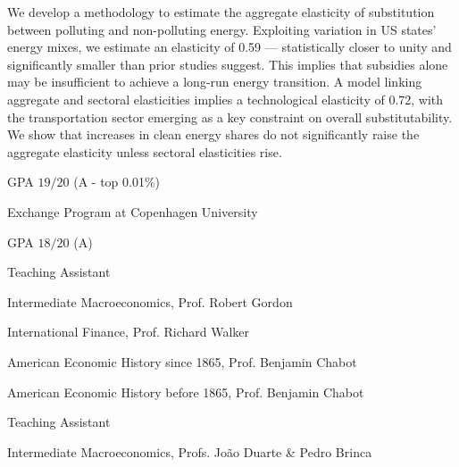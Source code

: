 \documentclass{practical-resume}
\begin{document}
	\begin{cvabstract}
	We develop a methodology to estimate the aggregate elasticity of substitution between polluting and non-polluting energy. Exploiting variation in US states' energy mixes, we estimate an elasticity of 0.59 --- statistically closer to unity and significantly smaller than prior studies suggest. This implies that subsidies alone may be insufficient to achieve a long-run energy transition. A model linking aggregate and sectoral elasticities implies a technological elasticity of 0.72, with the transportation sector emerging as a key constraint on overall substitutability. We show that increases in clean energy shares do not significantly raise the aggregate elasticity unless sectoral elasticities rise.
	\end{cvabstract}
	

	\begin{position}{}{}
		\item GPA $19/20$ (A - top 0.01\%)
		\item Exchange Program at Copenhagen University
	\end{position}

	\begin{position}{}{}
		\item GPA $18/20$ (A)
	\end{position}


	\begin{position}{Teaching Assistant}{}
		\item Intermediate Macroeconomics, Prof. Robert Gordon
		\item International Finance, Prof. Richard Walker
		\item American Economic History since 1865, Prof. Benjamin Chabot
		\item American Economic History before 1865, Prof. Benjamin Chabot
	\end{position}
	
	\begin{position}{Teaching Assistant}{}
		\item Intermediate Macroeconomics, Profs. João Duarte \& Pedro Brinca
	\end{position}
\end{document}
